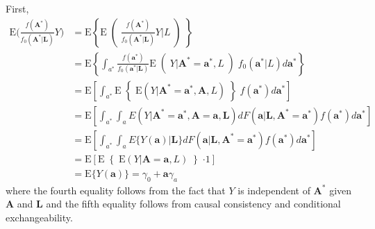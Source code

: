 \documentclass[12pt]{article}
\begin{document}
First,
\begin{align*}
\text{E} \bigg( \frac{f(\bm{A}^{*})}{f_{0}(\bm{A}^{*} | \bm{L})} Y \bigg) &= \text{E} \left \{ \text{E} \middle( \frac{f(\bm{A}^{*})}{f_{0}(\bm{A}^{*} | \bm{L})} Y | L \middle) \right \} \\
&= \text{E} \left \{ \int_{a^{*}} \frac{f(\bm{a}^{*})}{f_{0}(\bm{a}^{*} | \bm{L})}  \text{E} \middle( Y | \bm{A}^{*} = \bm{a}^{*},  L \middle) f_{0}(\bm{a}^{*} | L) d\bm{a}^{*} \right \} \\
&= \text{E} \left [ \int_{a^{*}} \text{E} \middle\{ \text{E}(Y | \bm{A}^{*} = \bm{a}^{*}, \bm{A}, L) \middle\} f(\bm{a}^{*}) d\bm{a}^{*} \right ] \\
&= \text{E} \left [ \int_{a^{*}} \int_{a} E(Y | \bm{A}^{*} = \bm{a}^{*}, \bm{A} = \bm{a}, \bm{L}) dF(\bm{a} | \bm{L}, \bm{A}^{*} = \bm{a}^{*}) f(\bm{a}^{*}) d\bm{a}^{*} \right ] \\
&= \text{E} \left [ \int_{a^{*}} \int_{a} E\{ Y(\bm{a}) | \bm{L} \} dF(\bm{a} | \bm{L}, \bm{A}^{*} = \bm{a}^{*}) f(\bm{a}^{*}) d\bm{a}^{*} \right ] \\
&= \text{E} \left [ \text{E} \middle\{ \text{E}(Y | \bm{A} = \bm{a}, L) \middle\} \cdot 1 \right ] \\
&= \text{E} \{ Y(\bm{a}) \} = \gamma_{0} + \bm{a}\gamma_{a}
\end{align*}
where the fourth equality follows from the fact that $Y$ is independent of $\bm{A}^{*}$ given $\bm{A}$ and $\bm{L}$ and the fifth equality follows from causal consistency and conditional exchangeability.
\end{document}
